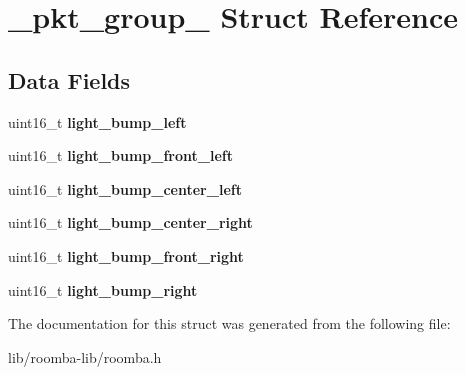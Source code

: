 \hypertarget{struct__pkt__group__106}{}\section{\+\_\+pkt\+\_\+group\+\_ Struct Reference}
\label{struct__pkt__group__106}
\subsection*{Data Fields}
\begin{DoxyCompactItemize}
\item 
\hypertarget{group__roomba-lib_ga2686ced69a7deee493d3617a7e3f25e9}{}uint16\+\_\+t {\bfseries light\+\_\+bump\+\_\+left}\label{group__roomba-lib_ga2686ced69a7deee493d3617a7e3f25e9}

\item 
\hypertarget{group__roomba-lib_ga616ec94b794aef982a6e24e6555fc22c}{}uint16\+\_\+t {\bfseries light\+\_\+bump\+\_\+front\+\_\+left}\label{group__roomba-lib_ga616ec94b794aef982a6e24e6555fc22c}

\item 
\hypertarget{group__roomba-lib_ga1a5e8d286ff1759ef39f97b0b16965e3}{}uint16\+\_\+t {\bfseries light\+\_\+bump\+\_\+center\+\_\+left}\label{group__roomba-lib_ga1a5e8d286ff1759ef39f97b0b16965e3}

\item 
\hypertarget{group__roomba-lib_ga10a5914d43822355fa6118a4d1a8d389}{}uint16\+\_\+t {\bfseries light\+\_\+bump\+\_\+center\+\_\+right}\label{group__roomba-lib_ga10a5914d43822355fa6118a4d1a8d389}

\item 
\hypertarget{group__roomba-lib_gad722687c41c2876edb9be69972c88576}{}uint16\+\_\+t {\bfseries light\+\_\+bump\+\_\+front\+\_\+right}\label{group__roomba-lib_gad722687c41c2876edb9be69972c88576}

\item 
\hypertarget{group__roomba-lib_ga2a7b04b214fadc407fcd20a25687227e}{}uint16\+\_\+t {\bfseries light\+\_\+bump\+\_\+right}\label{group__roomba-lib_ga2a7b04b214fadc407fcd20a25687227e}

\end{DoxyCompactItemize}


The documentation for this struct was generated from the following file\+:\begin{DoxyCompactItemize}
\item 
lib/roomba-\/lib/roomba.\+h\end{DoxyCompactItemize}
